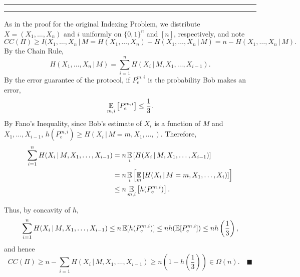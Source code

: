 \documentclass[11pt]{article}
\newcounter{questionCounter}
\newcounter{partCounter}[questionCounter]
\newenvironment{question}[2][\arabic{questionCounter}]{%
    \setcounter{partCounter}{0}%
    \vspace{.25in} \hrule \vspace{0.5em}%
        \noindent{\bf #2}%
    \vspace{0.8em} \hrule \vspace{.10in}%
    \addtocounter{questionCounter}{1}%
}{}
\newcommand{\mqed}{\quad \blacksquare}
\newcommand{\pr}{\operatornamewithlimits{\mathsf{Pr}}} %
\newcommand{\E}{\operatornamewithlimits{\mathbb{E}}} %
\newcommand{\giv}{\, | \,} %
\begin{document}
\begin{question}{Problem 6}
As in the proof for the original Indexing Problem, we distribute
$X = (X_1,\dots,X_n)$ and $i$ uniformly on $\{0,1\}^n$ and $[n]$, respectively,
and note
\[CC(\Pi)
    \geq I(X_1,\dots,X_n \giv M
    = H(X_1,\dots,X_n) - H(X_1,\dots,X_n \giv M)
    = n - H(X_1,\dots,X_n \giv M)
.\]
By the Chain Rule,
\[H(X_1,\dots,X_n \giv M) = \sum_{i = 1}^n H(X_i \giv M, X_1,\dots,X_{i - 1})
.\]
By the error guarantee of the protocol, if $P_e^{m,i}$ is the probability Bob
makes an error, \[\E_{m,i}\left[ P_e^{m,i} \right] \leq \frac13.\]
By Fano's Inequality, since Bob's estimate of $X_i$ is a function of $M$ and
$X_1,\dots,X_{i - 1}$,
$h(P_e^{m,i}) \geq H(X_i \giv M = m,X_1,\dots,)$.
Therefore,
\begin{align*}
\sum_{i = 1}^n H(X_i \giv M,X_1,\dots,X_{i - 1})
 &  = n\E_i \left[ H(X_i \giv M,X_1,\dots,X_{i - 1}) \right]              \\
 &  = n\E_i\left[\E_m\left[H(X_i \giv M = m,X_1,\dots,X_i)\right]\right]  \\
 &  \leq n\E_{m,i} \left[ h(P_e^{m,i}) \right].
\end{align*}

Thus, by concavity of $h$,
\[\sum_{i = 1}^n H(X_i \giv M, X_1,\dots,X_{i - 1})
    \leq n \E[h(P_e^{m,i})]
    \leq n h(\E[P_e^{m,i}])
    \leq n h\left( \frac13 \right)
,\]
and hence
\[CC(\Pi)
    \geq n -\sum_{i = 1} H(X_i \giv M,X_1,\dots,X_{i - 1})
    \geq n \left( 1 - h\left( \frac13 \right) \right)
    \in \Omega(n)
.\mqed\]
\end{question}
\end{document}
